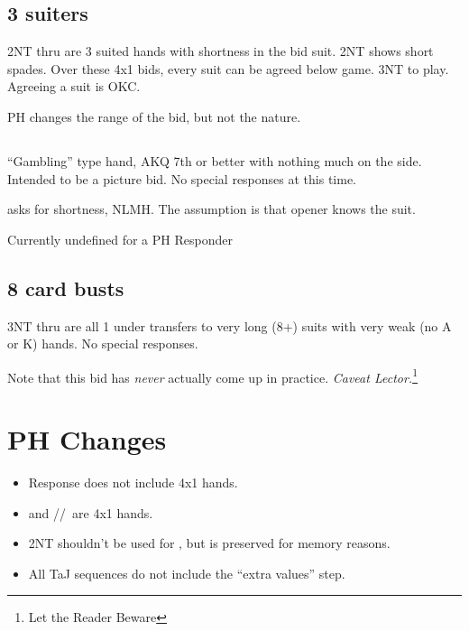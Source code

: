 \documentclass[main]{subfile}
\begin{document}
	\subsection{3 suiters}
	
	2NT thru  are 3 suited hands with shortness in the bid suit. 2NT shows short spades. Over these 4x1 bids, every suit can be agreed below game. 3NT to play.  Agreeing a suit is OKC.
	
	PH changes the range of the bid, but not the nature.
		
	\subsection[3S]{}
	
	``Gambling'' type hand, AKQ 7th or better with nothing much on the side. Intended to be a picture bid. No special responses at this time. 

	 asks for shortness, NLMH.  The assumption is that opener knows the suit. 
	
	Currently undefined for a PH Responder
	
	\subsection{8 card busts}
	
	3NT thru  are all 1 under transfers to very long (8+) suits with very weak (no A or K) hands. No special responses.
	
	Note that this bid has \textit{never} actually come up in practice.  \textit{Caveat Lector.}\footnote{Let the Reader Beware}

	\section{PH Changes}
	\begin{itemize}
		\item {} Response does not include 4x1 hands.
		\item {} and /\ddd/\hhh ~are 4x1 hands. 
		\item 2NT shouldn't be used for , but is preserved for memory reasons.
		\item All TaJ sequences do not include the ``extra values'' step.
	\end{itemize} 
\end{document}
